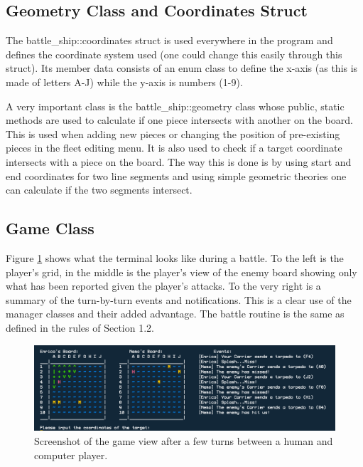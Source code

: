 \documentclass[11pt]{article} %
\begin{document}
\subsection{Geometry Class and Coordinates Struct}
The battle\_ship::coordinates struct is used everywhere in the program and defines
the coordinate system used (one could change this easily through this struct).
Its member data consists of an enum class to define the x-axis (as this is made of letters A-J) while the y-axis is numbers (1-9).
\\
\par A very important class is the battle\_ship::geometry class whose public, static methods are used to calculate
if one piece intersects with another on the board.
This is used when adding new pieces or changing the position of pre-existing pieces in the fleet editing menu.
It is also used to check if a target coordinate intersects with a piece on the board.
The way this is done is by using start and end coordinates for two line segments and using
simple geometric theories \cite{patpro} one can calculate if the two segments intersect.

\subsection{Game Class}
Figure \ref{fig:game_view} shows what the terminal looks like during a battle.
To the left is the player's grid, in the middle is the player's view of the enemy board showing only what has been reported
given the player's attacks.
To the very right is a summary of the turn-by-turn events and notifications.
This is a clear use of the manager classes and their added advantage.
The battle routine is the same as defined in the rules of Section 1.2.
\begin{figure}[H]
\centering
\includegraphics[scale=0.55]{images/game.png}
\caption{Screenshot of the game view after a few turns between a human and computer player.}
\label{fig:game_view}
\end{figure}
\end{document}
